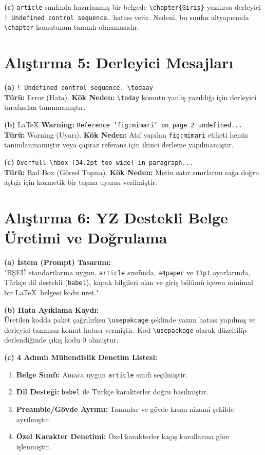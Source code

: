 \documentclass[a4paper, 11pt]{article}
\begin{document}
\textbf{(c)} \texttt{article} sınıfında hazırlanmış bir belgede \texttt{\textbackslash chapter\{Giriş\}} yazılırsa derleyici \texttt{! Undefined control sequence.} hatası verir. Nedeni, bu sınıfın altyapısında \texttt{\textbackslash chapter} komutunun tanımlı olmamasıdır.

\section*{Alıştırma 5: Derleyici Mesajları}
\textbf{(a)} \texttt{! Undefined control sequence. \textbackslash todaay} \\
\textbf{Türü:} Error (Hata). \textbf{Kök Neden:} \texttt{\textbackslash today} komutu yanlış yazıldığı için derleyici tarafından tanınmamıştır.

\textbf{(b)} \LaTeX{} \textbf{Warning:} \texttt{Reference 'fig:mimari' on page 2 undefined...} \\
\textbf{Türü:} Warning (Uyarı). \textbf{Kök Neden:} Atıf yapılan \texttt{fig:mimari} etiketi henüz tanımlanmamıştır veya çapraz referans için ikinci derleme yapılmamıştır.

\textbf{(c)} \texttt{Overfull \textbackslash hbox (34.2pt too wide) in paragraph...} \\
\textbf{Türü:} Bad Box (Görsel Taşma). \textbf{Kök Neden:} Metin satır sınırlarını sağa doğru aştığı için kozmetik bir taşma uyarısı verilmiştir.

\section*{Alıştırma 6: YZ Destekli Belge Üretimi ve Doğrulama}
\textbf{(a) İstem (Prompt) Tasarımı:} \\
"BŞEÜ standartlarına uygun, \texttt{article} sınıfında, \texttt{a4paper} ve \texttt{11pt} ayarlarında, Türkçe dil destekli (\texttt{babel}), kapak bilgileri olan ve giriş bölümü içeren minimal bir \LaTeX\ belgesi kodu üret."

\textbf{(b) Hata Ayıklama Kaydı:} \\
Üretilen kodda paket çağrılırken \texttt{\textbackslash usepakcage} şeklinde yazım hatası yapılmış ve derleyici tanımsız komut hatası vermiştir. Kod \texttt{\textbackslash usepackage} olarak düzeltilip derlendiğinde çıkış kodu 0 olmuştur.

\textbf{(c) 4 Adımlı Mühendislik Denetim Listesi:}
\begin{enumerate}
    \item \textbf{Belge Sınıfı:} Amaca uygun \texttt{article} sınıfı seçilmiştir.
    \item \textbf{Dil Desteği:} \texttt{babel} ile Türkçe karakterler doğru basılmıştır.
    \item \textbf{Preamble/Gövde Ayrımı:} Tanımlar ve gövde kısmı nizami şekilde ayrılmıştır.
    \item \textbf{Özel Karakter Denetimi:} Özel karakterler kaçış kurallarına göre işlenmiştir.
\end{enumerate}
\end{document}
